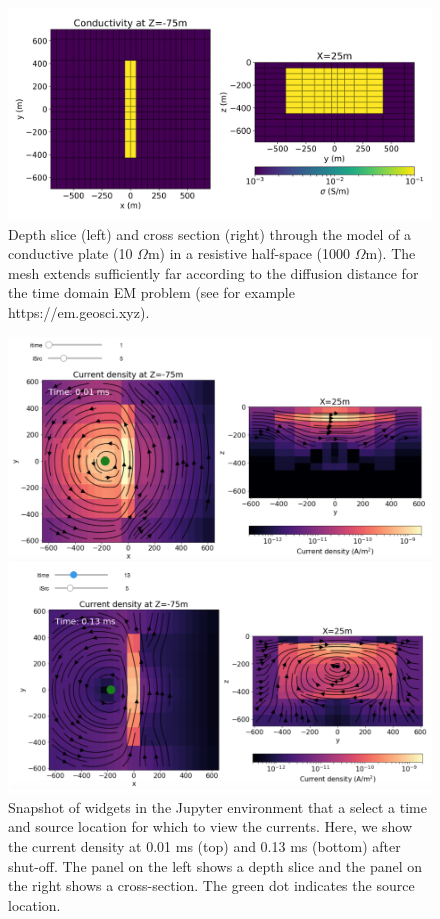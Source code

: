 \documentclass[paper]{geophysics}
\begin{document}
\begin{figure}
    \begin{center}
    \includegraphics[width=0.8\columnwidth]{figures/plate-model.png}
    \end{center}
\caption{
    Depth slice (left) and cross section (right) through the model of a conductive plate (10 $\Omega$m) in a resistive half-space (1000 $\Omega$m).
    The mesh extends sufficiently far according to the diffusion distance for the time domain EM problem (see for example https://em.geosci.xyz).
}
\label{fig:plate-model}
\end{figure}





\begin{figure}
    \begin{center}
    \includegraphics[width=0.8\columnwidth]{figures/currents-widget.png}
    \end{center}
\caption{
    Snapshot of widgets in the Jupyter environment that a select a time and source location for which to view the currents. Here, we show the current density at 0.01 ms (top) and 0.13 ms (bottom) after shut-off. The panel on the left shows a depth slice and the panel on the right shows a cross-section. The green dot indicates the source location.
}
\label{fig:currents-widget}
\end{figure}
\end{document}

